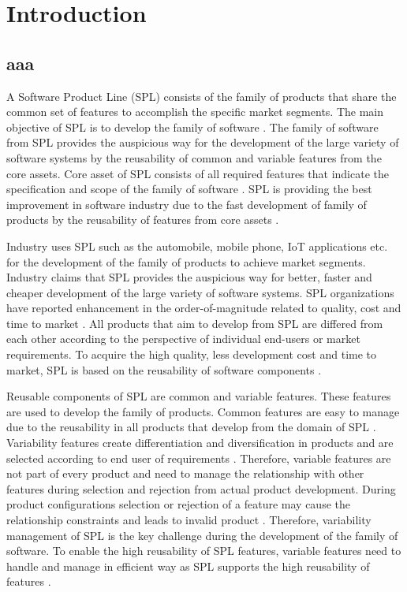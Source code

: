 
\chapter{Introduction}
\label{chapter1}

\section{aaa}

A Software Product Line (SPL) consists of the family of products that share the common set of features to accomplish the specific market segments. The main objective of SPL is to develop the family of software \cite{t1, t4, t5}. The family of software from SPL provides the auspicious way for the development of the large variety of software systems by the reusability of common and variable features from the core assets. Core asset of SPL consists of all required features that indicate the specification and scope of the family of software \cite{t7, t8, t9}. SPL is providing the best improvement in software industry due to the fast development of family of products by the reusability of features from core assets \cite{t10, t13}. 

Industry uses SPL such as the automobile, mobile phone, IoT applications etc. for the development of the family of products to achieve market segments. Industry claims that SPL provides the auspicious way for better, faster and cheaper development of the large variety of software systems. SPL organizations have reported enhancement in the order-of-magnitude related to quality, cost and time to market \cite{tr14, t15}. All products that aim to develop from SPL are differed from each other according to the perspective of individual end-users or market requirements. To acquire the high quality, less development cost and time to market, SPL is based on the reusability of software components \cite{t16, t11}.

Reusable components of SPL are common and variable features. These features are used to develop the family of products. Common features are easy to manage due to the reusability in all products that develop from the domain of SPL \cite{t3, t6, t12}. Variability features create differentiation and diversification in products and are selected according to end user of requirements \cite{t2, t17}. Therefore, variable features are not part of every product and need to manage the relationship with other features during selection and rejection from actual product development. During product configurations selection or rejection of a feature may cause the relationship constraints and leads to invalid product \cite{t18, t19}. Therefore, variability management of SPL is the key challenge during the development of the family of software. To enable the high reusability of SPL features, variable features need to handle and manage in efficient way as SPL supports the high reusability of features \cite{t20, tt20}.

